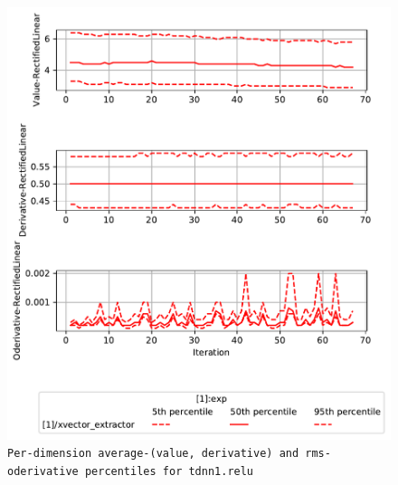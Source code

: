 \documentclass[prl,10pt,twocolumn]{revtex4}
\begin{document}
\newpage
\begin{figure}[h]
  \begin{center}
    \caption{\texttt{Per-dimension average-(value, derivative) and rms-oderivative percentiles for tdnn1.relu}}
    \includegraphics[width=\textwidth]{exp/xvector_extractor/report/nonlinstats_tdnn1_dot_relu.pdf}
  \end{center}
\end{figure}
\clearpage
\end{document}
